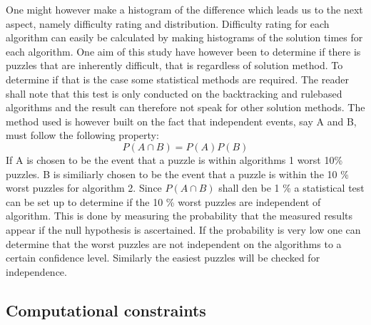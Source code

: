 \documentclass[a4paper,11pt]{kth-mag}
\begin{document}
One might however make a histogram of the difference which leads us to the next aspect, namely difficulty rating and distribution. 
Difficulty rating for each algorithm can easily be calculated by making histograms of the solution times for each algorithm. 
One aim of this study have however been to determine if there is puzzles that are inherently difficult, that is regardless of solution method.
To determine if that is the case some statistical methods are required. The reader shall note that this test is only conducted on the backtracking and rulebased algorithms and the result can therefore not speak for other solution methods.
The method used is however built on the fact that independent events, say A and B, must follow the following property:
\[
P(A \cap B) = P(A) P(B)
\] 
If A is chosen to be the event that a puzzle is within algorithms 1 worst 10\% puzzles.
B is similiarly chosen to be the event that a puzzle is within the 10 \% worst puzzles for algorithm 2.
Since $P(A \cap B)$ shall den be 1 \% a statistical test can be set up to determine if the 10 \% worst puzzles are independent of algorithm. This is done by measuring the probability that the measured results appear if the null hypothesis is ascertained. If the probability is very low one can determine that the worst puzzles are not independent on the algorithms to a certain confidence level.
Similarly the easiest puzzles will be checked for independence.\\
\subsection{Computational constraints}
\end{document}
